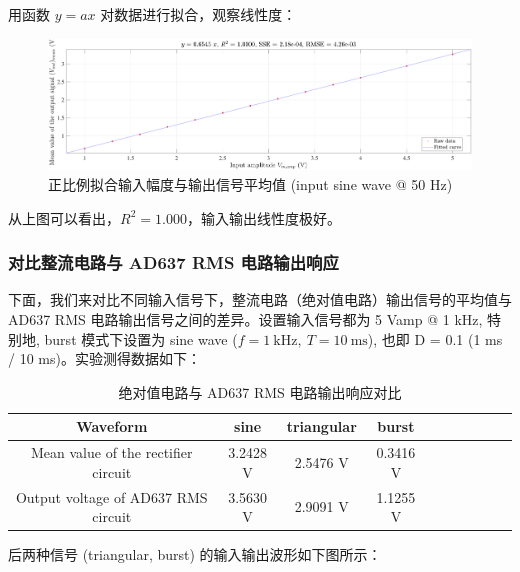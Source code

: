 \documentclass[UTF8]{article}
\begin{document}
用函数 $y = ax$ 对数据进行拟合，观察线性度：
\begin{figure}[H]\centering
    \includegraphics[width=\columnwidth]{LCE-05-精密整流/assets/1N4148/linearity.pdf}
    \caption{正比例拟合输入幅度与输出信号平均值 (input sine wave @ 50 Hz)}
\end{figure}

从上图可以看出，$R^2 = 1.000$，输入输出线性度极好。

\subsubsection{对比整流电路与 AD637 RMS 电路输出响应}

下面，我们来对比不同输入信号下，整流电路（绝对值电路）输出信号的平均值与 AD637 RMS 电路输出信号之间的差异。设置输入信号都为 5 Vamp @ 1 kHz, 特别地, burst 模式下设置为 sine wave ($f = 1 \ \mathrm{kHz},\ T = 10 \ \mathrm{ms}$), 也即 D = 0.1 (1 ms / 10 ms)。实验测得数据如下：

\begin{table}[H]\centering
    \caption{绝对值电路与 AD637 RMS 电路输出响应对比}
    \label{绝对值电路与 AD637 RMS 电路输出响应对比}
\begin{tabular}{cccccccccc}\toprule
    Waveform & sine  & triangular & burst \\
    \midrule
    Mean value of the rectifier circuit & 3.2428 V & 2.5476 V & 0.3416 V \\
    Output voltage of AD637 RMS circuit & 3.5630 V & 2.9091 V & 1.1255 V \\
    \bottomrule
\end{tabular}
\end{table}

后两种信号 (triangular, burst) 的输入输出波形如下图所示：
\end{document}
